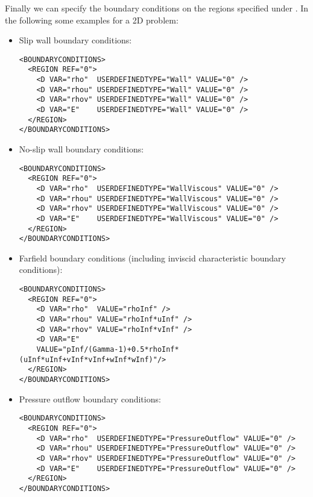 Finally we can specify the boundary conditions on the regions specified under .
In the following some examples for a 2D problem:
\begin{itemize}
\item Slip wall boundary conditions:
\begin{lstlisting}[style=XmlStyle]                
<BOUNDARYCONDITIONS>
  <REGION REF="0">
    <D VAR="rho"  USERDEFINEDTYPE="Wall" VALUE="0" />
    <D VAR="rhou" USERDEFINEDTYPE="Wall" VALUE="0" />
    <D VAR="rhov" USERDEFINEDTYPE="Wall" VALUE="0" />
    <D VAR="E"    USERDEFINEDTYPE="Wall" VALUE="0" />
  </REGION>
</BOUNDARYCONDITIONS>
\end{lstlisting}

\item No-slip wall boundary conditions:
\begin{lstlisting}[style=XmlStyle]                
<BOUNDARYCONDITIONS>
  <REGION REF="0">
    <D VAR="rho"  USERDEFINEDTYPE="WallViscous" VALUE="0" />
    <D VAR="rhou" USERDEFINEDTYPE="WallViscous" VALUE="0" />
    <D VAR="rhov" USERDEFINEDTYPE="WallViscous" VALUE="0" />
    <D VAR="E"    USERDEFINEDTYPE="WallViscous" VALUE="0" />
  </REGION>
</BOUNDARYCONDITIONS>
\end{lstlisting}

\item Farfield boundary conditions (including inviscid characteristic boundary conditions):
\begin{lstlisting}[style=XmlStyle] 
<BOUNDARYCONDITIONS>  
  <REGION REF="0">
    <D VAR="rho"  VALUE="rhoInf" />
    <D VAR="rhou" VALUE="rhoInf*uInf" />
    <D VAR="rhov" VALUE="rhoInf*vInf" />
    <D VAR="E"    
    VALUE="pInf/(Gamma-1)+0.5*rhoInf*(uInf*uInf+vInf*vInf+wInf*wInf)"/>
  </REGION>
</BOUNDARYCONDITIONS>
\end{lstlisting}

\item Pressure outflow boundary conditions:
\begin{lstlisting}[style=XmlStyle]                
<BOUNDARYCONDITIONS>
  <REGION REF="0">
    <D VAR="rho"  USERDEFINEDTYPE="PressureOutflow" VALUE="0" />
    <D VAR="rhou" USERDEFINEDTYPE="PressureOutflow" VALUE="0" />
    <D VAR="rhov" USERDEFINEDTYPE="PressureOutflow" VALUE="0" />
    <D VAR="E"    USERDEFINEDTYPE="PressureOutflow" VALUE="0" />
  </REGION>
</BOUNDARYCONDITIONS>
\end{lstlisting}
\end{itemize}


